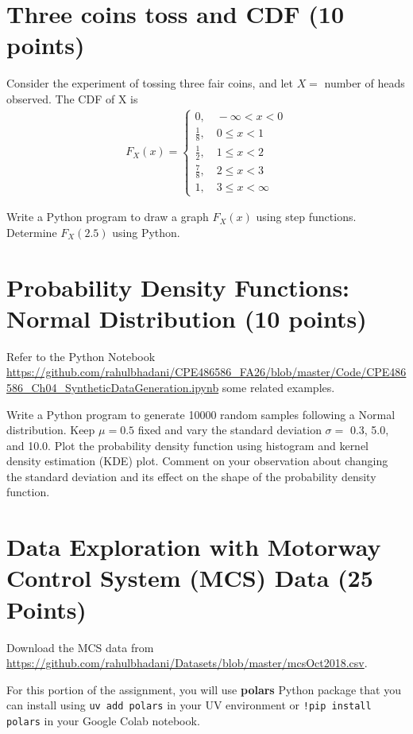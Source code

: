 \documentclass[12pt, xcolor=dvipsnames,svgnames,x11names]{article}
\begin{document}
 \section{Three coins toss and CDF (10 points)}
Consider the experiment of tossing three fair coins, and let $X = $ number of heads observed. The CDF of X is 
\begin{equation}
    \begin{aligned}
        F_X(x) = \begin{cases}
            0, \quad -\infty  < x < 0\\
            \frac{1}{8}, \quad 0\leq x < 1\\
            \frac{1}{2}, \quad 1 \leq x < 2\\
            \frac{7}{8}, \quad 2 \leq x < 3\\
            1, \quad 3 \leq x < \infty
        \end{cases}
    \end{aligned}
\end{equation}

Write a Python program to draw a graph $F_X(x)$ using step functions. Determine $F_X(2.5)$ using Python.


\section{Probability Density Functions: Normal Distribution (10 points)}
Refer to the Python Notebook \url{https://github.com/rahulbhadani/CPE486586_FA26/blob/master/Code/CPE486586_Ch04_SyntheticDataGeneration.ipynb} some related examples.


Write a Python program to generate 10000 random samples following a Normal distribution. Keep $\mu = 0.5$ fixed and vary the standard deviation $\sigma  = $ 0.3, 5.0, and 10.0. Plot the probability density function using histogram and kernel density estimation (KDE) plot. Comment on your observation about changing the standard deviation and its effect on the shape of the probability density function.

\section{Data Exploration with Motorway Control System (MCS) Data (25 Points)}


Download the MCS data from \url{https://github.com/rahulbhadani/Datasets/blob/master/mcsOct2018.csv}.

For this portion of the assignment, you will use \textbf{polars} Python package that you can install using \texttt{uv add polars} in your UV environment or \texttt{!pip install polars} in your Google Colab notebook.
\end{document}
